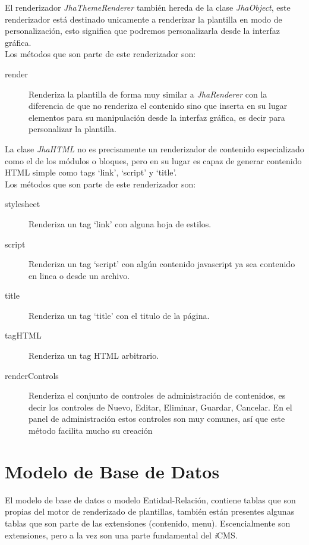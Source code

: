 El renderizador \textit{JhaThemeRenderer} tambi\'en hereda de la clase \textit{JhaObject}, este renderizador est\'a destinado unicamente a renderizar la plantilla en modo de personalizaci\'on, esto significa que podremos personalizarla desde la interfaz gr\'afica.\\
Los m\'etodos que son parte de este renderizador son:
\begin{description}
\item[render] Renderiza la plantilla de forma muy similar a \textit{JhaRenderer} con la diferencia de que no renderiza el contenido sino que inserta en su lugar elementos para su manipulaci\'on desde la interfaz gr\'afica, es decir para personalizar la plantilla.
\end{description}



La clase \textit{JhaHTML} no es precisamente un renderizador de contenido especializado como el de los m\'odulos o bloques, pero en su lugar es capaz de generar contenido HTML simple como tags `link', `script' y `title'.\\
Los m\'etodos que son parte de este renderizador son:
\begin{description}
\item[stylesheet] Renderiza un tag `link' con alguna hoja de estilos.
\item[script] Renderiza un tag `script' con alg\'un contenido javascript ya sea contenido en linea o desde un archivo.
\item[title] Renderiza un tag `title' con el titulo de la p\'agina.
\item[tagHTML] Renderiza un tag HTML arbitrario.
\item[renderControls] Renderiza el conjunto de controles de administraci\'on de contenidos, es decir los controles de Nuevo, Editar, Eliminar, Guardar, Cancelar. En el panel de administraci\'on estos controles son muy comunes, as\'i que este m\'etodo facilita mucho su creaci\'on
\end{description}



\section{Modelo de Base de Datos}
El modelo de base de datos o modelo Entidad-Relaci\'on, contiene tablas que son propias del motor de renderizado de plantillas, tambi\'en est\'an presentes algunas tablas que son parte de las extensiones (contenido, menu). Escencialmente son extensiones, pero a la vez son una parte fundamental del \textit{i}CMS.

